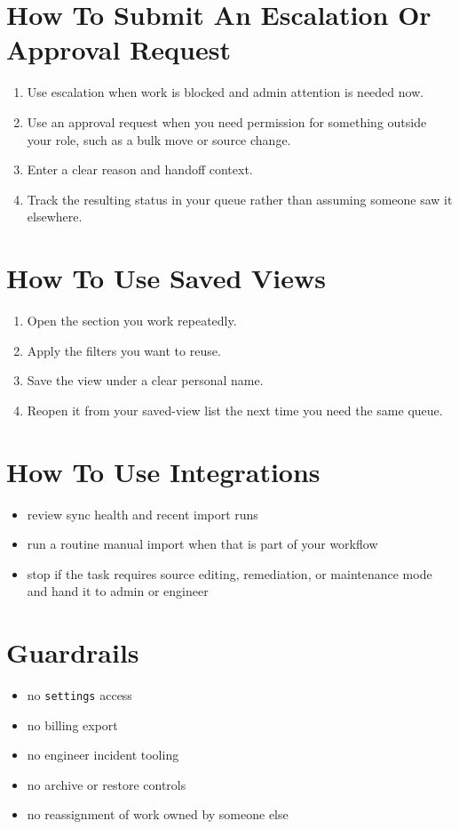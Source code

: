 \documentclass[11pt]{article}
\begin{document}
\section*{How To Submit An Escalation Or Approval Request}
\begin{enumerate}
  \item Use escalation when work is blocked and admin attention is needed now.
  \item Use an approval request when you need permission for something outside your role, such as a bulk move or source change.
  \item Enter a clear reason and handoff context.
  \item Track the resulting status in your queue rather than assuming someone saw it elsewhere.
\end{enumerate}

\section*{How To Use Saved Views}
\begin{enumerate}
  \item Open the section you work repeatedly.
  \item Apply the filters you want to reuse.
  \item Save the view under a clear personal name.
  \item Reopen it from your saved-view list the next time you need the same queue.
\end{enumerate}

\section*{How To Use Integrations}
\begin{itemize}
  \item review sync health and recent import runs
  \item run a routine manual import when that is part of your workflow
  \item stop if the task requires source editing, remediation, or maintenance mode and hand it to admin or engineer
\end{itemize}

\section*{Guardrails}
\begin{itemize}
  \item no \texttt{settings} access
  \item no billing export
  \item no engineer incident tooling
  \item no archive or restore controls
  \item no reassignment of work owned by someone else
\end{itemize}
\end{document}
